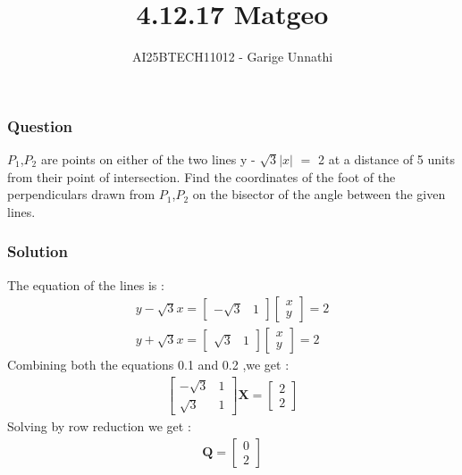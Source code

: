 \documentclass{beamer}
\title{4.12.17 Matgeo}
\author{AI25BTECH11012 - Garige Unnathi}
\date{}
\begin{document}
\frame{\titlepage}

\begin{frame}
\frametitle{Question}
\textbf{$P_1$},\textbf{$P_2$} are points on either of the two lines y - $\sqrt{3}$$\lvert x \rvert$ $=$ 2 at a distance of 5 units from their point of intersection. Find the coordinates of the foot of the perpendiculars drawn from \textbf{$P_1$},\textbf{$P_2$} on the bisector of the angle between the given lines.\\
\end{frame}


\begin{frame}
\frametitle{Solution}
The equation of the lines is :
\begin{align}
  y - \sqrt{3}x = \begin{bmatrix}-\sqrt{3} & 1\end{bmatrix}\begin{bmatrix}x\\y\end{bmatrix} = 2\\
   y + \sqrt{3}x = \begin{bmatrix}\sqrt{3} & 1\end{bmatrix}\begin{bmatrix}x\\y\end{bmatrix} = 2 
\end{align}
Combining both the equations 0.1 and 0.2 ,we get :
\begin{align}
   \begin{bmatrix}-\sqrt{3} & 1\\
           \sqrt{3} & 1 \end{bmatrix}\textbf{X} = \begin{bmatrix}2\\2\end{bmatrix}
\end{align}
Solving by row reduction we get :
\begin{align}
\textbf{Q} = \begin{bmatrix}0\\2\end{bmatrix}
\end{align}
\end{frame}
\end{document}
